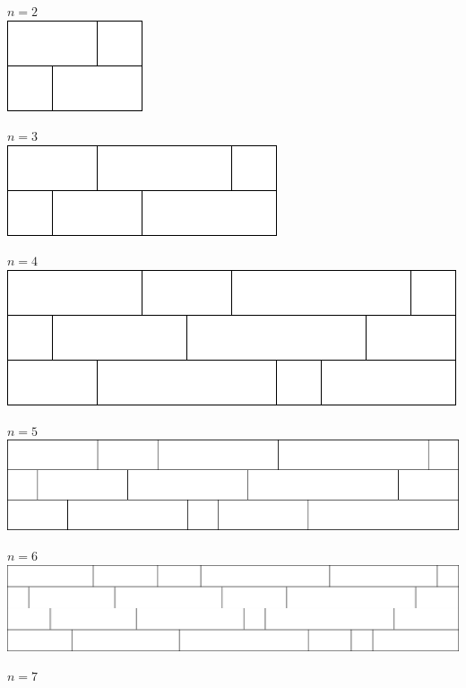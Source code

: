 
$n = 2$\\
\includegraphics[scale=.3]{../solutions/2}
\par\vspace{1em}
$n = 3$\\
\includegraphics[scale=.3]{../solutions/3}
\par\vspace{1em}
$n = 4$\\
\includegraphics[scale=.3]{../solutions/4}
\par\vspace{1em}
$n = 5$\\
\includegraphics[scale=.3]{../solutions/5}
\par\vspace{1em}
$n = 6$\\
\includegraphics[scale=.3]{../solutions/6}
\par\vspace{1em}
$n = 7$\\
